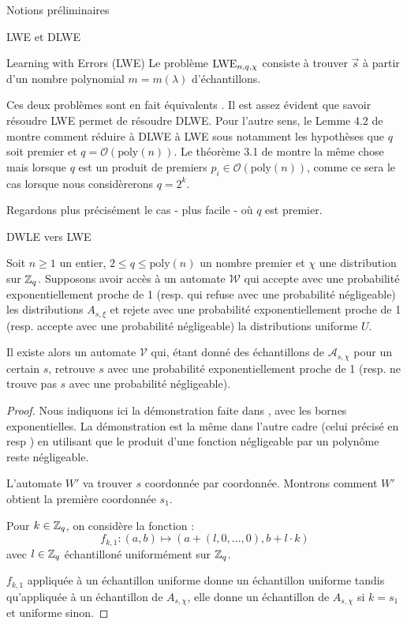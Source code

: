\begin{section}{Notions préliminaires}
\begin{subsection}{LWE et DLWE}
\begin{definition}{Learning with Errors (LWE)}
	Le problème $\text{LWE}_{n,q,\chi}$ consiste à trouver $\vec{s}$ à partir d'un nombre polynomial $m = m(\lambda)$ d'échantillons.
	\end{definition}

	Ces deux problèmes sont en fait \og équivalents \fg. Il est assez évident que savoir résoudre LWE permet de résoudre DLWE. Pour l'autre sens, le Lemme
	4.2 de \cite{STOC:Regev05} montre comment réduire à DLWE à LWE sous notamment les hypothèses que $q$ soit  
	premier et $q = \mathcal{O}(\text{poly}(n))$. Le théorème 3.1 de \cite{EPRINT:MicPei11} montre la même chose
	mais lorsque $q$ est un produit de premiers $p_i \in \mathcal{O}(\text{poly}(n))$, comme ce sera le cas lorsque
	nous considèrerons $q = 2^k$.

	Regardons plus précisément le cas - plus facile - où $q$ est premier.
	\begin{prop}{DWLE vers LWE}

	Soit $n \geqslant 1$ un entier, $2 \leqslant q \leqslant \text{poly}(n)$ un nombre premier et $\chi$ une
	distribution sur $\mathbb{Z}_q$. Supposons avoir accès à un automate $\mathcal{W}$ qui accepte avec une probabilité
	exponentiellement proche de 1 (resp. qui refuse avec une probabilité négligeable) les distributions $A_{s, \xi}$ et rejete avec une probabilité exponentiellement
	proche de 1 (resp. accepte avec une probabilité négligeable) la distributions uniforme $U$.
	
	Il existe alors un automate $\mathcal{V}$ qui, étant donné des échantillons de $\mathcal{A}_{s,\chi}$ pour un
	certain $s$, retrouve $s$ avec une probabilité exponentiellement proche de 1 (resp. ne trouve pas $s$ 
	avec une probabilité négligeable).
	\end{prop}
	\begin{proof}
	Nous indiquons ici la démonstration faite dans \cite{STOC:Regev05}, avec les bornes 
	exponentielles. La démonstration est la même dans l'autre cadre (celui précisé en \og resp \fg)
	en utilisant que le produit d'une fonction négligeable par un polynôme reste négligeable.
	
	L'automate $W'$ va trouver $s$ coordonnée par coordonnée. Montrons comment $W'$ obtient la première coordonnée $s_1$.
	
	Pour $k \in \mathbb{Z}_q$, on considère la fonction :
	\[f_{k,1}: (a,b) \mapsto (a + (l, 0, ..., 0), b + l \cdot k) \]
	avec $l\in \mathbb{Z}_q$ échantilloné uniformément sur $\mathbb{Z}_q$.
	
	$f_{k,1}$ appliquée à un échantillon uniforme donne un échantillon uniforme tandis qu'appliquée à un échantillon
	de $A_{s, \chi}$, elle donne un échantillon de $A_{s, \chi}$ si $k = s_1$ et uniforme sinon.
	

\end{proof}
\end{subsection}
\end{section}
